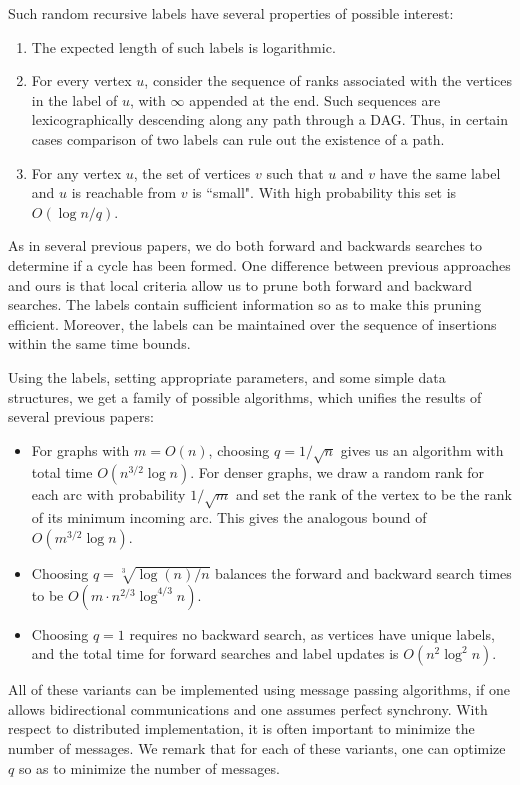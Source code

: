 \documentclass[11pt]{article}
\theoremstyle{plain}
\theoremstyle{definition}
\theoremstyle{remark}
\numberwithin{equation}{section}
\begin{document}
Such random recursive labels have several properties of possible
interest:
\begin{enumerate}
  \item The expected length of such labels is logarithmic.
\item For every vertex $u$, consider the sequence of ranks associated with the vertices in the label of $u$, with $\infty$ appended at the end. Such sequences are lexicographically descending along any path through a DAG. Thus, in certain cases comparison of two labels can rule out the existence of a path.
\item For any vertex $u$, the set of vertices $v$ such that $u$ and $v$ have the same label and $u$ is reachable from $v$ is ``small". With high probability this set is $O(\log n/q)$.
\end{enumerate}

As in several previous papers, we do both forward and backwards
searches to determine if a cycle has been formed. One difference
between previous approaches and ours is that local criteria allow us
to prune both forward and backward searches. The labels contain
sufficient information so as to make this pruning efficient.
Moreover, the labels can be maintained over the sequence of insertions within the same
time bounds.



Using the labels, setting appropriate parameters, and some simple
data structures, we get a family of possible algorithms, which
unifies the results of several previous papers:

\begin{itemize}
\item For graphs with $m=O(n)$, choosing $q=1/\sqrt{n}$ gives us an algorithm with total time $O(n^{3/2}\log n)$.
For denser graphs, we draw a random rank for each arc with
probability $1/\sqrt{m}$ and set the rank of the vertex to be the
rank of its minimum incoming arc. This gives the analogous bound of
$O(m^{3/2}\log n)$.

\item Choosing $q=\sqrt[3]{\log(n)/n}$ balances the forward and backward search times to be $O(m \cdot n^{2/3}\log^{4/3} n)$.
\item Choosing $q=1$ requires no backward search, as vertices have
  unique labels, and the total time for forward searches and label updates is $O(n^2\log^2 n)$.

\end{itemize}

All of these variants can be implemented using message passing
algorithms, if one allows bidirectional communications and one
assumes perfect synchrony. With respect to distributed
implementation, it is often important to minimize the number of
messages.
 We remark that for each of these
variants, one can optimize $q$ so as to minimize the number of
messages.
\end{document}
